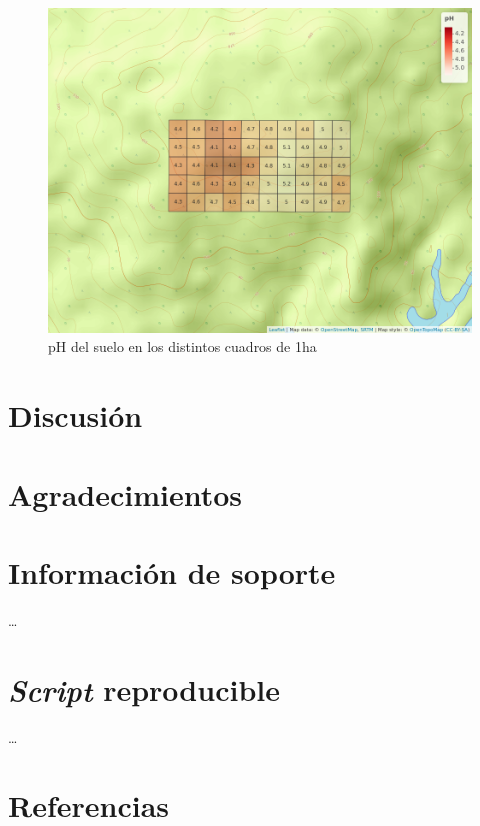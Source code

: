 \documentclass[11pt,]{article}
\begin{document}
\begin{figure}
\centering
\includegraphics{mapa_cuadros_ph.png}
\caption{pH del suelo en los distintos cuadros de 1ha
\label{fig:mapa_cuadros_ph}}
\end{figure}

\section{Discusión}\label{discusiuxf3n}

\section{Agradecimientos}\label{agradecimientos}

\section{Información de soporte}\label{informaciuxf3n-de-soporte}

\ldots

\section{\texorpdfstring{\emph{Script}
reproducible}{Script reproducible}}\label{script-reproducible}

\ldots

\section*{Referencias}\label{referencias}
\end{document}
